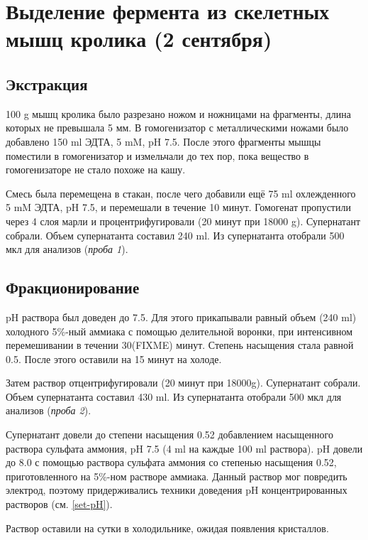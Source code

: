 \section{Выделение фермента из скелетных мышц кролика (2 сентября)}
\subsection{Экстракция}
100 g мышц кролика было разрезано ножом и ножницами на фрагменты,
длина которых не превышала 5 мм.
В гомогенизатор с металлическими ножами было добавлено 150 ml ЭДТА, 5 mM, pH 7.5.
После этого фрагменты мышцы поместили в гомогенизатор и измельчали до тех пор,
пока вещество в гомогенизаторе не стало похоже на кашу.

Смесь была перемещена в стакан, после чего добавили ещё 75 ml охлежденного 5 mM ЭДТА, pH 7.5,
и перемешали в течение 10 минут.
Гомогенат пропустили через 4 слоя марли и процентрифугировали (20 минут при 18000 g).
Супернатант собрали. Объем супернатанта составил 240 ml.
Из супернатанта отобрали 500 мкл для анализов (\emph{проба 1}).

\subsection{Фракционирование}
\label{2-frac-end}
pH раствора был доведен до 7.5.
Для этого прикапывали равный объем (240 ml) холодного 5\%-ный аммиака
с помощью делительной воронки, при интенсивном перемешивании в течении 30(FIXME) минут.
Степень насыщения стала равной 0.5.
После этого оставили на 15 минут на холоде.

Затем раствор отцентрифугировали (20 минут при 18000g).
Супернатант собрали. Объем супернатанта составил 430 ml.
Из супернатанта отобрали 500 мкл для анализов (\emph{проба 2}).

Супернатант довели до степени насыщения 0.52 добавлением
насыщенного раствора сульфата аммония, pH 7.5 (4 ml  на каждые 100 ml раствора).
pH довели до 8.0 с помощью раствора сульфата аммония со степенью насыщения 0.52,
приготовленного на 5\%-ном растворе аммиака.
Данный раствор мог повредить электрод, поэтому придерживались
техники доведения pH концентрированных растворов (см. \ref{set-pH}).

Раствор оставили на сутки в холодильнике, ожидая появления кристаллов.

